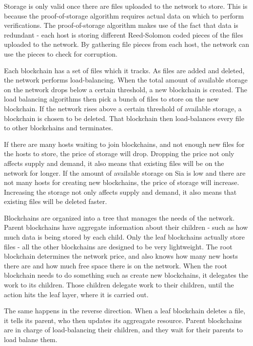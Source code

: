 \documentclass[twocolumn]{article}
\begin{document}
Storage is only valid once there are files uploaded to the network to store.
This is because the proof-of-storage algorithm requires actual data on which to perform verifications.
The proof-of-storage algorithm makes use of the fact that data is redundant - each host is storing different Reed-Solomon coded pieces of the files uploaded to the network.
By gathering file pieces from each host, the network can use the pieces to check for corruption.

Each blockchain has a set of files which it tracks.
As files are added and deleted, the network performs load-balancing.
When the total amount of available storage on the network drops below a certain threshold, a new blockchain is created.
The load balancing algorithms then pick a bunch of files to store on the new blockchain.
If the network rises above a certain threshold of available storage, a blockchain is chosen to be deleted.
That blockchain then load-balances every file to other blockchains and terminates.

If there are many hosts waiting to join blockchains, and not enough new files for the hosts to store, the price of storage will drop.
Dropping the price not only affects supply and demand, it also means that existing files will be on the network for longer.
If the amount of available storage on Sia is low and there are not many hosts for creating new blockchains, the price of storage will increase.
Increasing the storage not only affects supply and demand, it also means that existing files will be deleted faster.

Blockchains are organized into a tree that manages the needs of the network.
Parent blockchains have aggregate information about their children - such as how much data is being stored by each child.
Only the leaf blockchains actually store files - all the other blockchains are designed to be very lightweight.
The root blockchain determines the network price, and also knows how many new hosts there are and how much free space there is on the network.
When the root blockchain needs to do something such as create new blockchains, it delegates the work to its children.
Those children delegate work to their children, until the action hits the leaf layer, where it is carried out.

The same happens in the reverse direction.
When a leaf blockchain deletes a file, it tells its parent, who then updates its aggreagate resource.
Parent blockchains are in charge of load-balancing their children, and they wait for their parents to load balane them.
\end{document}
